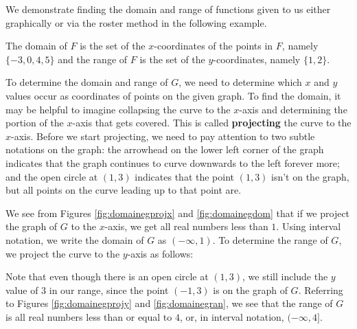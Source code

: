 \smallskip

We demonstrate finding the domain and range of functions given to us either graphically or via the roster method in the following example.

\medskip


{
The domain of $F$ is the set of the $x$-coordinates of the points in $F$, namely  $\{ -3, 0, 4, 5 \}$ and the range of $F$ is the set of the $y$-coordinates, namely $\{ 1,2 \}.$

\smallskip

\noindent To determine the domain and range of $G$, we need to determine which $x$ and $y$ values occur as coordinates of points on the given graph.  To find the domain, it may be helpful to imagine collapsing the curve to the $x$-axis and determining the portion of the $x$-axis that gets covered.  This is called  \textbf{projecting} the curve to the $x$-axis.  Before we start projecting, we need to pay attention to two subtle notations on the graph:  the arrowhead on the lower left corner of the graph indicates that the graph continues to curve downwards to the left forever more; and the open circle at $(1,3)$ indicates that the point $(1,3)$ isn't on the graph, but all points on the curve leading up to that point are.



We see from Figures \ref{fig:domainegprojx} and \ref{fig:domainegdom} that if we project the graph of $G$ to the $x$-axis, we get all real numbers less than $1$.  Using interval notation, we write the domain of $G$ as $(-\infty, 1)$.  To determine the range of $G$, we project the curve to the $y$-axis as follows: 


Note that even though there is an open circle at $(1,3)$, we still include the $y$ value of $3$ in our range, since the point $(-1,3)$ is on the graph of $G$.  Referring to Figures \ref{fig:domainegprojy} and \ref{fig:domainegran}, we see that the range of $G$ is all real numbers less than or equal to $4$, or, in interval notation,  $(-\infty, 4]$. 
}

